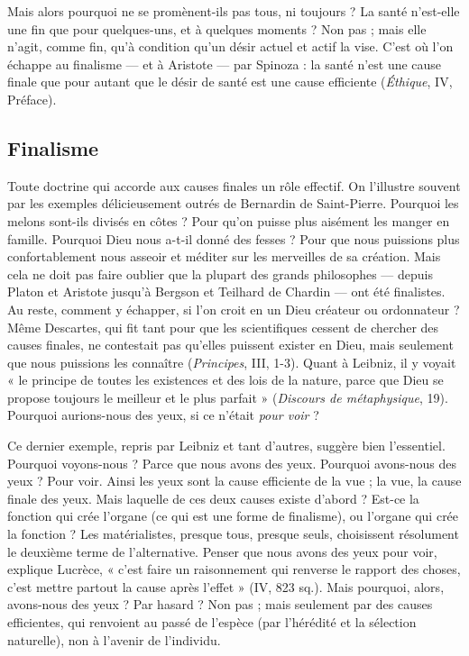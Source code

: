 Mais alors pourquoi ne se promènent-ils pas tous, ni toujours ? La santé
n'est-elle une fin que pour quelques-uns, et à quelques moments ? Non pas ;
mais elle n’agit, comme fin, qu’à condition qu’un désir actuel et actif la vise.
C’est où l’on échappe au finalisme — et à Aristote — par Spinoza : la santé n’est
une cause finale que pour autant que le désir de santé est une cause efficiente
({\it Éthique}, IV, Préface).

\subsection{Finalisme}

Toute doctrine qui accorde aux causes finales un rôle effectif.
On l’illustre souvent par les exemples délicieusement outrés de
Bernardin de Saint-Pierre. Pourquoi les melons sont-ils divisés en côtes ? Pour
qu’on puisse plus aisément les manger en famille. Pourquoi Dieu nous a-t-il
donné des fesses ? Pour que nous puissions plus confortablement nous asseoir
et méditer sur les merveilles de sa création. Mais cela ne doit pas faire oublier
que la plupart des grands philosophes — depuis Platon et Aristote jusqu’à
Bergson et Teilhard de Chardin — ont été finalistes. Au reste, comment y
échapper, si l’on croit en un Dieu créateur ou ordonnateur ? Même Descartes,
qui fit tant pour que les scientifiques cessent de chercher des causes finales, ne
contestait pas qu’elles puissent exister en Dieu, mais seulement que nous puissions
les connaître ({\it Principes}, III, 1-3). Quant à Leibniz, il y voyait « le principe
de toutes les existences et des lois de la nature, parce que Dieu se propose toujours
le meilleur et le plus parfait » ({\it Discours de métaphysique}, 19). Pourquoi
aurions-nous des yeux, si ce n’était {\it pour voir} ?

Ce dernier exemple, repris par Leibniz et tant d’autres, suggère bien l’essentiel.
Pourquoi voyons-nous ? Parce que nous avons des yeux. Pourquoi avons-nous
des yeux ? Pour voir. Ainsi les yeux sont la cause efficiente de la vue ; la
vue, la cause finale des yeux. Mais laquelle de ces deux causes existe d’abord ?
Est-ce la fonction qui crée l’organe (ce qui est une forme de finalisme), ou
l'organe qui crée la fonction ? Les matérialistes, presque tous, presque seuls,
choisissent résolument le deuxième terme de l'alternative. Penser que nous
avons des yeux pour voir, explique Lucrèce, « c’est faire un raisonnement qui
renverse le rapport des choses, c’est mettre partout la cause après l’effet » (IV,
823 sq.). Mais pourquoi, alors, avons-nous des yeux ? Par hasard ? Non pas ;
mais seulement par des causes efficientes, qui renvoient au passé de l’espèce
(par l’hérédité et la sélection naturelle), non à l’avenir de l’individu.

